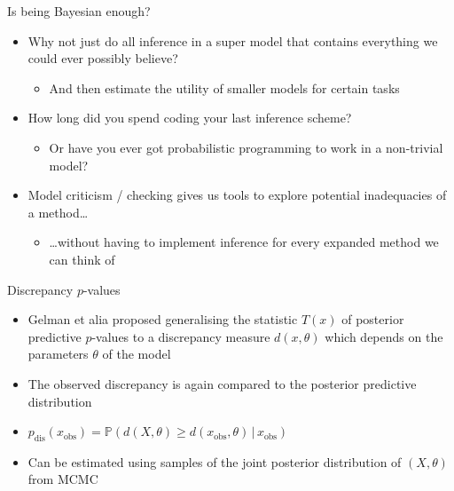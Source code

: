 \begin{frame}{Is being Bayesian enough?}
  \begin{itemize}
    \item Why not just do all inference in a super model that contains everything we could ever possibly believe?
    \pause
    \begin{itemize}
      \item And then \eg estimate the utility of smaller models for certain tasks
    \end{itemize}
    \vspace{\baselineskip}
    \pause
    \item How long did you spend coding your last inference scheme?
    \begin{itemize}
      \item Or have you ever got probabilistic programming to work in a non-trivial model?
    \end{itemize}
    \vspace{\baselineskip}
    \pause
    \item Model criticism / checking gives us tools to explore potential inadequacies of a method\dots
    \begin{itemize}
       \item \dots without having to implement inference for every expanded method we can think of
     \end{itemize}
  \end{itemize}
\end{frame}

\begin{frame}{Discrepancy $p$-values}
  \begin{itemize}
    \item Gelman et alia \cite{Gelman1996-ez} proposed generalising the statistic $T(x)$ of posterior predictive $p$-values to a discrepancy measure $d(x, \theta)$ which depends on the parameters $\theta$ of the model
    \vspace{\baselineskip}
    \pause
    \item The observed discrepancy is again compared to the posterior predictive distribution
    \vspace{\baselineskip}
    \pause
    \item $p_{\textrm{dis}}(x_{\textrm{obs}}) = \mathbb{P}(d(X,\theta) \geq d(x_{\textrm{obs}},\theta)\,|\,x_{\textrm{obs}})$
    \vspace{\baselineskip}
    \pause
    \item Can be estimated using samples of the joint posterior distribution of $(X, \theta)$ \eg from MCMC
  \end{itemize}
\end{frame}

